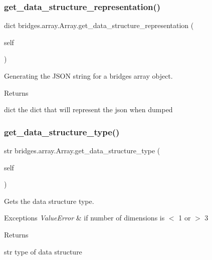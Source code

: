 \subsubsection{\texorpdfstring{get\_data\_structure\_representation()}{get\_data\_structure\_representation()}}
{\footnotesize\ttfamily  dict bridges.\+array.\+Array.\+get\+\_\+data\+\_\+structure\+\_\+representation (\begin{DoxyParamCaption}\item[{}]{self }\end{DoxyParamCaption})}



Generating the J\+S\+ON string for a bridges array object. 

\begin{DoxyReturn}{Returns}


dict the dict that will represent the json when dumped 
\end{DoxyReturn}
\mbox{\label{classbridges_1_1array_1_1_array_aa52e4e7984fa0cc6ed1f160d25dfe14e}} 
\subsubsection{\texorpdfstring{get\_data\_structure\_type()}{get\_data\_structure\_type()}}
{\footnotesize\ttfamily  str bridges.\+array.\+Array.\+get\+\_\+data\+\_\+structure\+\_\+type (\begin{DoxyParamCaption}\item[{}]{self }\end{DoxyParamCaption})}



Gets the data structure type. 


\begin{DoxyExceptions}{Exceptions}
{\em Value\+Error} & if number of dimensions is $<$ 1 or $>$ 3 \\
\hline
\end{DoxyExceptions}
\begin{DoxyReturn}{Returns}


str type of data structure 
\end{DoxyReturn}
\mbox{\label{classbridges_1_1array_1_1_array_a522509608957badbb17197b0bb7d11e6}} 

